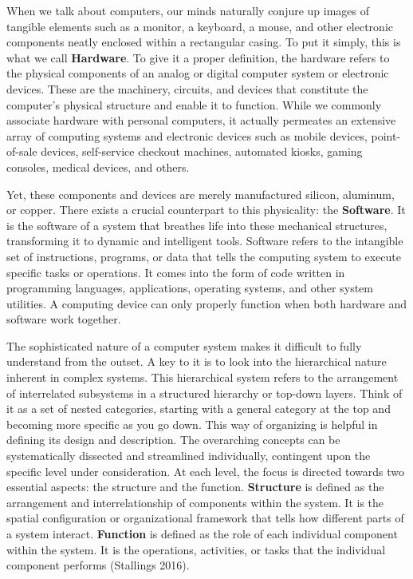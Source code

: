 \documentclass[
  letterpaper,
  DIV=11,
  numbers=noendperiod]{scrreprt}
\begin{document}
When we talk about computers, our minds naturally conjure up images of
tangible elements such as a monitor, a keyboard, a mouse, and other
electronic components neatly enclosed within a rectangular casing. To
put it simply, this is what we call \textbf{Hardware}. To give it a
proper definition, the hardware refers to the physical components of an
analog or digital computer system or electronic devices. These are the
machinery, circuits, and devices that constitute the computer's physical
structure and enable it to function. While we commonly associate
hardware with personal computers, it actually permeates an extensive
array of computing systems and electronic devices such as mobile
devices, point-of-sale devices, self-service checkout machines,
automated kiosks, gaming consoles, medical devices, and others.

Yet, these components and devices are merely manufactured silicon,
aluminum, or copper. There exists a crucial counterpart to this
physicality: the \textbf{Software}. It is the software of a system that
breathes life into these mechanical structures, transforming it to
dynamic and intelligent tools. Software refers to the intangible set of
instructions, programs, or data that tells the computing system to
execute specific tasks or operations. It comes into the form of code
written in programming languages, applications, operating systems, and
other system utilities. A computing device can only properly function
when both hardware and software work together.

The sophisticated nature of a computer system makes it difficult to
fully understand from the outset. A key to it is to look into the
hierarchical nature inherent in complex systems. This hierarchical
system refers to the arrangement of interrelated subsystems in a
structured hierarchy or top-down layers. Think of it as a set of nested
categories, starting with a general category at the top and becoming
more specific as you go down. This way of organizing is helpful in
defining its design and description. The overarching concepts can be
systematically dissected and streamlined individually, contingent upon
the specific level under consideration. At each level, the focus is
directed towards two essential aspects: the structure and the function.
\textbf{Structure} is defined as the arrangement and interrelationship
of components within the system. It is the spatial configuration or
organizational framework that tells how different parts of a system
interact. \textbf{Function} is defined as the role of each individual
component within the system. It is the operations, activities, or tasks
that the individual component performs (Stallings 2016).
\end{document}
